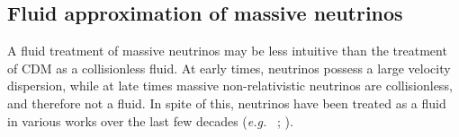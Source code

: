 \documentclass[twocolumn,superscriptaddress,prd]{revtex4}
\newcommand{\eg}{\textit{e.g.}~}
\begin{document}


\subsection{ Fluid approximation of massive neutrinos }
\label{sec:NuFluid}

A fluid treatment of massive neutrinos may be less intuitive than the
treatment of CDM as a collisionless fluid.  At early
times, neutrinos possess a large velocity dispersion, while at
late times massive non-relativistic neutrinos are collisionless, and
therefore not a fluid.  
In spite of this, neutrinos have been treated
as a fluid in various works over the last few decades (\eg
\cite{Bond83}; \cite{Holtzman89}).  
\end{document}
